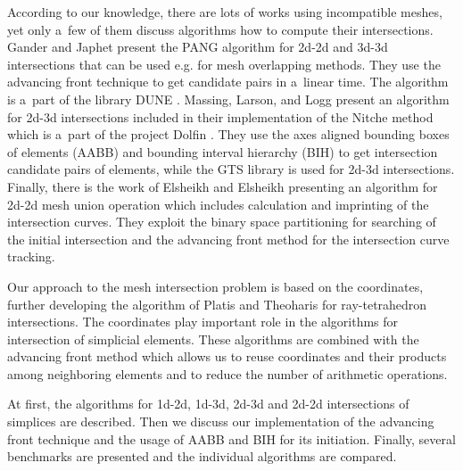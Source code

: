 
According to our knowledge, there are lots of works using incompatible meshes, yet only a~few of them discuss algorithms how to compute their intersections. 
Gander and Japhet \cite{gander_algorithm_2013} present the PANG algorithm for 2d-2d and 3d-3d intersections that can be used e.g. for mesh overlapping methods.
They use the advancing front technique to get candidate pairs in a~linear time. The algorithm is a~part of the library DUNE \cite{bastian_towards_2005}.
Massing, Larson, and Logg \cite{massing_efficient_2013} present an algorithm for 2d-3d intersections included in their implementation of the Nitche method 
which is a~part of the project Dolfin \cite{dolphin_2012}. They use the axes aligned bounding boxes of elements (AABB) and bounding interval hierarchy (BIH) 
to get intersection candidate pairs of elements, while the GTS library \cite{gtslib} is used for 2d-3d intersections. 
Finally, there is the work of Elsheikh and Elsheikh \cite{elsheikh_reliable_2012} presenting an algorithm for 2d-2d mesh union operation which includes 
calculation and imprinting of the intersection curves. They exploit the binary space partitioning for searching of the initial intersection and 
the advancing front method for the intersection curve tracking. 

Our approach to the mesh intersection problem is based on the \plucker coordinates,
further developing the algorithm of Platis and Theoharis \cite{platis_fast_2003} for ray-tetrahedron intersections. 
The \plucker coordinates play important role in the algorithms for intersection of simplicial elements.
These algorithms are combined with the advancing front method which allows us to reuse \plucker coordinates and their products among neighboring
elements and to reduce the number of arithmetic operations. 

At first, the algorithms for 1d-2d, 1d-3d, 2d-3d and 2d-2d intersections of simplices are described.
Then we discuss our implementation of the advancing front technique and the usage of AABB and BIH for its initiation.
Finally, several benchmarks are presented and the individual algorithms are compared.


